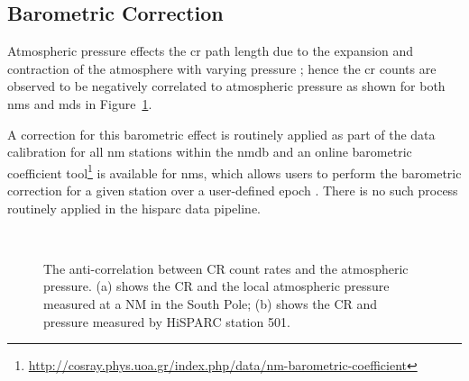 \subsection{Barometric Correction}\label{sec:HS_P_corr}


Atmospheric pressure effects the \gls{cr} path length due to the expansion and contraction of the atmosphere with varying pressure \citep{dorman_theory_1972, paschalis_online_2013}; hence the \gls{cr} counts are observed to be negatively correlated to atmospheric pressure as shown for both \glspl{nm} and \glspl{md} in Figure~\ref{fig:CR_V_P}. 

A correction for this barometric effect is routinely applied as part of the data calibration for all \gls{nm} stations within the \gls{nmdb} and an online barometric coefficient tool\footnote{\url{http://cosray.phys.uoa.gr/index.php/data/nm-barometric-coefficient}} is available for \glspl{nm}, which allows users to perform the barometric correction for a given station over a user-defined epoch \citep{paschalis_online_2013}. There is no such process routinely applied in the \gls{hisparc} data pipeline.


\begin{figure}[ht]
	\centering
	 \\
	
	\caption{The anti-correlation between CR count rates and the atmospheric pressure. (a) shows the CR and the local atmospheric pressure measured at a NM in the South Pole; (b) shows the CR and pressure measured by HiSPARC station 501.}
	\label{fig:CR_V_P}
\end{figure}


